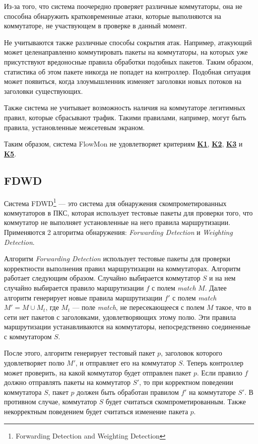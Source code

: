 \documentclass[../thesis.tex]{subfiles}
\begin{document}
Из-за того, что система поочередно проверяет различные коммутаторы, она не способна обнаружить кратковременные атаки, которые выполняются на коммутаторе, не участвующем в проверке в данный момент.

Не учитываются также различные способы сокрытия атак.
Например, атакующий может целенаправленно коммутировать пакеты на коммутаторы, на которых уже присутствуют вредоносные правила обработки подобных пакетов.
Таким образом, статистика об этом пакете никогда не попадет на контроллер.
Подобная ситуация может появиться, когда злоумышленник изменяет заголовки новых потоков на заголовки существующих.

Также система не учитывает возможность наличия на коммутаторе легитимных правил, которые сбрасывают трафик.
Такими правилами, например, могут быть правила, установленные межсетевым экраном.

{
\hypersetup{linkcolor=black}

Таким образом, система FlowMon не удовлетворяет критериям \hyperref[criterion:K1]{\textbf{K1}}, \hyperref[criterion:K2]{\textbf{K2}}, \hyperref[criterion:K3]{\textbf{K3}} и \hyperref[criterion:K5]{\textbf{K5}}.
}

\subsection{FDWD} \label{subsection:system4}

Система FDWD\footnote{Forwarding Detection and Weighting Detection} \cite{chi2015detect} --- это система для обнаружения скомпрометированных коммутаторов в ПКС, которая использует тестовые пакеты для проверки того, что коммутатор не выполняет установленные на него правила маршрутизации.
Применяются 2 алгоритма обнаружения: \textit{Forwarding Detection} и \textit{Weighting Detection}.

Алгоритм \textit{Forwarding Detection} использует тестовые пакеты для проверки корректности выполнения правил маршрутизации на коммутаторах.
Алгоритм работает следующим образом.
Случайно выбирается коммутатор $S$ и на нем случайно выбирается правило маршрутизации $f$ с полем \textit{match} $M$.
Далее алгоритм генерирует новые правила маршрутизации $f'$ с полем \textit{match} $M' = M\cup M_t$, где $M_t$ --- поле \textit{match}, не пересекающееся с полем $M$ такое, что в сети нет пакетов с заголовками, удовлетворяющих этому полю.
Эти правила маршрутизации устанавливаются на коммутаторы, непосредственно соединенные с коммутатором $S$.

После этого, алгоритм генерирует тестовый пакет $p$, заголовок которого удовлетворяет полю $M'$, и отправляет его на коммутатор $S$.
Теперь контроллер может проверить, на какой коммутатор будет отправлен пакет $p$.
Если правило $f$ должно отправлять пакеты на коммутатор $S'$, то при корректном поведении коммутатора $S$, пакет $p$ должен быть обработан правилом $f'$ на коммутаторе $S'$.
В противном случае, коммутатор $S$ будет считаться скомпрометированным.
Также некорректным поведением будет считаться изменение пакета $p$.
\end{document}
